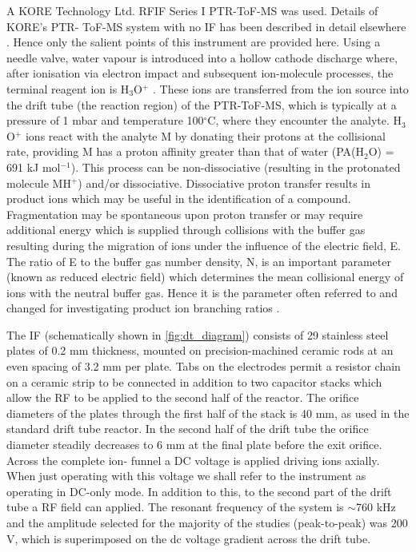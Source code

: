 A KORE Technology Ltd. RFIF Series I PTR-ToF-MS was used. Details of KORE’s PTR- ToF-MS system with no IF has been described in detail elsewhere \cite{blake2004demonstration,ENNIS200572,RN445}. %
Hence only the salient points of this instrument are provided here. Using a needle valve, water vapour is introduced into a hollow cathode discharge where, after ionisation via electron impact and subsequent ion-molecule processes, the terminal reagent ion is H$_3$O$^+$ \cite{ellis2013proton}. These ions are transferred from the ion source into the drift tube (the reaction region) of the PTR-ToF-MS, which is typically at a pressure of 1 mbar and temperature 100$^{\circ}$C, where they encounter the analyte. H$_3$O$^+$ ions react with the analyte M by donating their protons at the collisional rate, providing M has a proton affinity greater than that of water (PA(H$_2$O) = 691 kJ mol$^{-1}$). This process can be non-dissociative (resulting in the protonated molecule MH$^+$) and/or dissociative. Dissociative proton transfer results in product ions which may be useful in the identification of a compound. Fragmentation may be spontaneous upon proton transfer or may require additional energy which is supplied through collisions with the buffer gas resulting during the migration of ions under the influence of the electric field, E. The ratio of E to the buffer gas number density, N, is an important parameter (known as reduced electric field) which determines the mean collisional energy of ions with the neutral buffer gas. Hence it is the parameter often referred to and changed for investigating product ion branching ratios \cite{brown2010proton,sulzer2012proton,doi:10.1002/jms.2993,kassebacher2013investigations,sulzer2013applications,agarwal2014sensitivity,acton2014headspace,lanza2015selective}.

The IF (schematically shown in \autoref{fig:dt_diagram}) consists of 29 stainless steel plates of 0.2 mm thickness, mounted on precision-machined ceramic rods at an even spacing of 3.2 mm per plate. Tabs on the electrodes permit a resistor chain on a ceramic strip to be connected in addition to two capacitor stacks which allow the RF to be applied to the second half of the reactor. The orifice diameters of the plates through the first half of the stack is 40 mm, as used in the standard drift tube reactor. In the second half of the drift tube the orifice diameter steadily decreases to 6 mm at the final plate before the exit orifice. Across the complete ion- funnel a DC voltage is applied driving ions axially. When just operating with this voltage we shall refer to the instrument as operating in DC-only mode. In addition to this, to the second part of the drift tube a RF field can applied. The resonant frequency of the system is $\sim$760 kHz and the amplitude selected for the majority of the studies (peak-to-peak) was 200 V, which is superimposed on the dc voltage gradient across the drift tube. 

